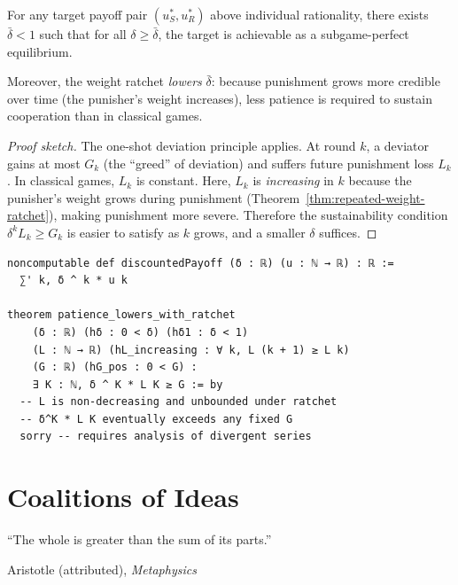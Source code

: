 \begin{theorem}
\label{thm:patience-cooperation}
For any target payoff pair $(u_S^*, u_R^*)$ above individual rationality,
there exists $\bar\delta < 1$ such that for all $\delta \geq \bar\delta$,
the target is achievable as a subgame-perfect equilibrium.

Moreover, the weight ratchet \emph{lowers} $\bar\delta$: because punishment
grows more credible over time (the punisher's weight increases),
less patience is required to sustain cooperation than in classical games.
\end{theorem}

\begin{proof}[Proof sketch]
The one-shot deviation principle applies.  At round $k$, a deviator gains
at most $G_k$ (the ``greed'' of deviation) and suffers future punishment
loss $L_k$.  In classical games, $L_k$ is constant.  Here, $L_k$ is
\emph{increasing} in $k$ because the punisher's weight grows during
       punishment (Theorem~\ref{thm:repeated-weight-ratchet}), making punishment more severe.
Therefore the sustainability condition $\delta^k L_k \geq G_k$ is easier to
satisfy as $k$ grows, and a smaller $\delta$ suffices.
\end{proof}

\begin{lstlisting}[caption={Lean 4: Discounted payoff and patience bound}]
noncomputable def discountedPayoff (δ : ℝ) (u : ℕ → ℝ) : ℝ :=
  ∑' k, δ ^ k * u k

theorem patience_lowers_with_ratchet
    (δ : ℝ) (hδ : 0 < δ) (hδ1 : δ < 1)
    (L : ℕ → ℝ) (hL_increasing : ∀ k, L (k + 1) ≥ L k)
    (G : ℝ) (hG_pos : 0 < G) :
    ∃ K : ℕ, δ ^ K * L K ≥ G := by
  -- L is non-decreasing and unbounded under ratchet
  -- δ^K * L K eventually exceeds any fixed G
  sorry -- requires analysis of divergent series
\end{lstlisting}


\chapter{Coalitions of Ideas}
\label{ch:coalitions-deep}

\epigraph{``The whole is greater than the sum of its parts.''}%
{Aristotle (attributed), \emph{Metaphysics}}



